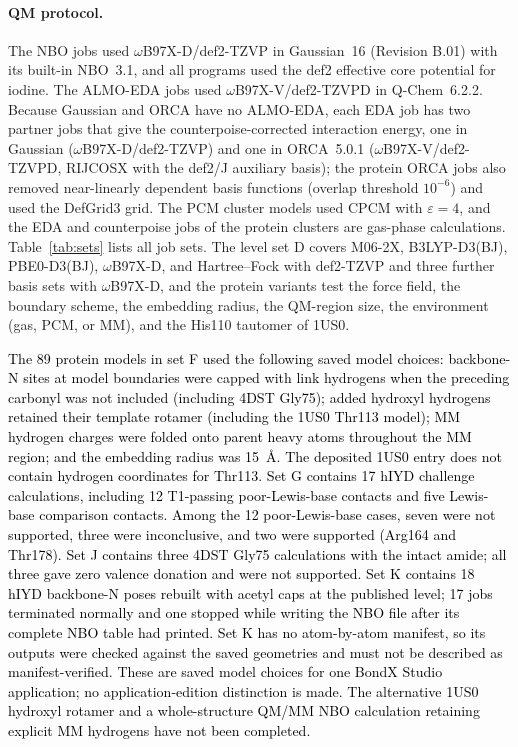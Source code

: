 \documentclass[journal=jcisd8,manuscript=article,layout=two-column]{achemso}
\newcommand{\tcb}[1]{{\textcolor{black}{#1}}}
\begin{document}
\paragraph{QM protocol.}
The NBO jobs used $\omega$B97X-D\cite{ChaiHeadGordon2008}/def2-TZVP\cite{WeigendAhlrichs2005} in Gaussian~16 (Revision B.01) with its built-in NBO~3.1,\cite{g16,NBO31} and all programs used the def2 effective core potential for iodine.\cite{Peterson2003} The ALMO-EDA jobs used $\omega$B97X-V\cite{Mardirossian2014,Vydrov2010}/def2-TZVPD\cite{Rappoport2010} in Q-Chem~6.2.2.\cite{Epifanovsky2021} Because Gaussian and ORCA have no ALMO-EDA, each EDA job has two partner jobs that give the counterpoise-corrected\cite{BoysBernardi1970} interaction energy, one in Gaussian ($\omega$B97X-D/def2-TZVP) and one in ORCA~5.0.1\cite{Neese2020,Neese2022} ($\omega$B97X-V/def2-TZVPD, RIJCOSX with the def2/J auxiliary basis\cite{Neese2009,Weigend2006}); the protein ORCA jobs also removed near-linearly dependent basis functions (overlap threshold $10^{-6}$) and used the DefGrid3 grid. The PCM cluster models used CPCM with $\varepsilon=4$,\cite{BaroneCossi1998,Cossi2003} and the EDA and counterpoise jobs of the protein clusters are gas-phase calculations. Table~\ref{tab:sets} lists all job sets. The level set D covers M06-2X,\cite{ZhaoTruhlar2008} B3LYP-D3(BJ),\cite{Becke1993,LYP1988,Grimme2010,Grimme2011} PBE0-D3(BJ),\cite{AdamoBarone1999,Grimme2010,Grimme2011} $\omega$B97X-D, and Hartree--Fock with def2-TZVP and three further basis sets with $\omega$B97X-D, and the protein variants test the force field, the boundary scheme, the embedding radius, the QM-region size, the environment (gas, PCM, or MM), and the His110 tautomer of 1US0.

\tcb{The 89 protein models in set F used the following saved model choices: backbone-N sites at model boundaries were capped with link hydrogens when the preceding carbonyl was not included (including 4DST Gly75); added hydroxyl hydrogens retained their template rotamer (including the 1US0 Thr113 model); MM hydrogen charges were folded onto parent heavy atoms throughout the MM region; and the embedding radius was 15~\AA{}. The deposited 1US0 entry does not contain hydrogen coordinates for Thr113. Set G contains 17 hIYD challenge calculations, including 12 T1-passing poor-Lewis-base contacts and five Lewis-base comparison contacts. Among the 12 poor-Lewis-base cases, seven were not supported, three were inconclusive, and two were supported (Arg164 and Thr178). Set J contains three 4DST Gly75 calculations with the intact amide; all three gave zero valence donation and were not supported. Set K contains 18 hIYD backbone-N poses rebuilt with acetyl caps at the published level; 17 jobs terminated normally and one stopped while writing the NBO file after its complete NBO table had printed. Set K has no atom-by-atom manifest, so its outputs were checked against the saved geometries and must not be described as manifest-verified. These are saved model choices for one BondX Studio application; no application-edition distinction is made. The alternative 1US0 hydroxyl rotamer and a whole-structure QM/MM NBO calculation retaining explicit MM hydrogens have not been completed.}
\end{document}
